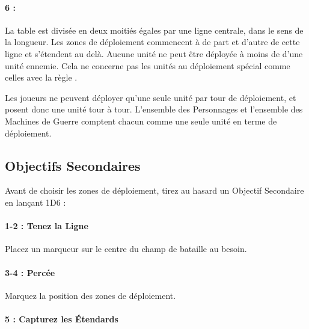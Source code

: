\hypertarget{counterthrust}{\paragraph{6 : \counterthrust{}}}

\begin{minipage}[c]{0.35\textwidth}
\def\svgwidth{\textwidth}

\end{minipage}\hfill
\begin{minipage}[c]{0.62\textwidth}
La table est divisée en deux moitiés égales par une ligne centrale, dans le sens de la longueur. Les zones de déploiement commencent à  de part et d'autre de cette ligne et s'étendent au delà. Aucune unité ne peut être déployée à moins de  d'une unité ennemie. Cela ne concerne pas les unités au déploiement spécial comme celles avec la règle \scout{}.

Les joueurs ne peuvent déployer qu'une seule unité par tour de déploiement, et posent donc une unité tour à tour. L'ensemble des Personnages et l'ensemble des Machines de Guerre comptent chacun comme une seule unité en terme de déploiement.
\end{minipage}


\newpage
\hypertarget{secondaryobjectives}{\subsection{Objectifs Secondaires}}

Avant de choisir les zones de déploiement, tirez au hasard un Objectif Secondaire en lançant 1D6 :

\paragraph{1-2 : Tenez la Ligne}

\newline
Placez un marqueur sur le centre du champ de bataille au besoin.

\paragraph{3-4 : Percée}

\newline
Marquez la position des zones de déploiement.

\paragraph{5 : Capturez les Étendards}

